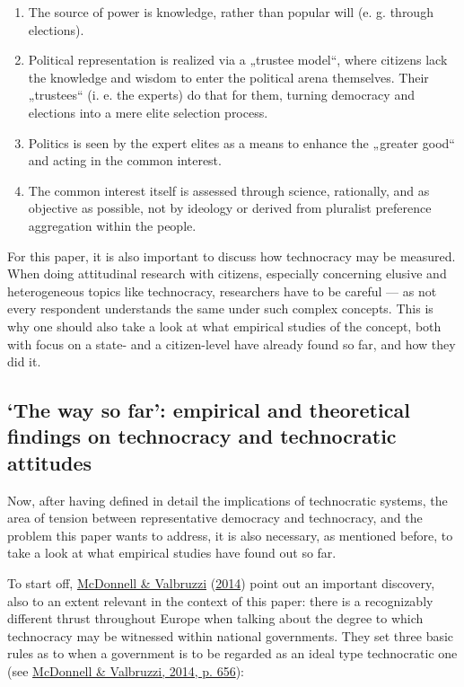 \documentclass[
  12pt,
  english,
]{article}
\begin{document}
\begin{enumerate}
\def\labelenumi{\arabic{enumi}.}
\item
  The source of power is knowledge, rather than popular will (e. g.
  through elections).
\item
  Political representation is realized via a „trustee model``, where
  citizens lack the knowledge and wisdom to enter the political arena
  themselves. Their „trustees`` (i. e. the experts) do that for them,
  turning democracy and elections into a mere elite selection process.
\item
  Politics is seen by the expert elites as a means to enhance the
  „greater good`` and acting in the common interest.
\item
  The common interest itself is assessed through science, rationally,
  and as objective as possible, not by ideology or derived from
  pluralist preference aggregation within the people.
\end{enumerate}

For this paper, it is also important to discuss how technocracy may be
measured. When doing attitudinal research with citizens, especially
concerning elusive and heterogeneous topics like technocracy,
researchers have to be careful --- as not every respondent understands
the same under such complex concepts. This is why one should also take a
look at what empirical studies of the concept, both with focus on a
state- and a citizen-level have already found so far, and how they did
it.

\hypertarget{the-way-so-far-empirical-and-theoretical-findings-on-technocracy-and-technocratic-attitudes}{%
\subsection{`The way so far': empirical and theoretical findings on
technocracy and technocratic
attitudes}\label{the-way-so-far-empirical-and-theoretical-findings-on-technocracy-and-technocratic-attitudes}}

Now, after having defined in detail the implications of technocratic
systems, the area of tension between representative democracy and
technocracy, and the problem this paper wants to address, it is also
necessary, as mentioned before, to take a look at what empirical studies
have found out so far.

To start off, \protect\hyperlink{ref-mcdonnell2014defining}{McDonnell \&
Valbruzzi} (\protect\hyperlink{ref-mcdonnell2014defining}{2014}) point
out an important discovery, also to an extent relevant in the context of
this paper: there is a recognizably different thrust throughout Europe
when talking about the degree to which technocracy may be witnessed
within national governments. They set three basic rules as to when a
government is to be regarded as an ideal type technocratic one (see
\protect\hyperlink{ref-mcdonnell2014defining}{McDonnell \& Valbruzzi,
2014, p. 656}):
\end{document}
